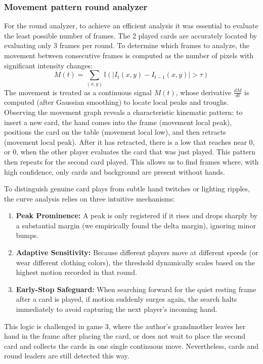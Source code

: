 \documentclass[11pt,a4paper]{article}
\begin{document}
\subsubsection{Movement pattern round analyzer}
For the round analyzer, to achieve an efficient analysis it was essential to
evaluate the least possible number of frames. The 2 played cards are accurately
located by evaluating only 3 frames per round. To determine which frames to
analyze, the movement between consecutive frames is computed as the number of
pixels with significant intensity changes:
\begin{equation}
    M(t) = \sum_{(x,y)} \mathbb{I}\left( \left| I_t(x,y) - I_{t-1}(x,y) \right| > \tau \right)
\end{equation}
The movement is treated as a continuous signal $M(t)$, whose derivative
$\frac{dM}{dt}$ is computed (after Gaussian smoothing) to locate local peaks and
troughs. Observing the movement graph reveals a characteristic kinematic pattern:
to insert a new card, the hand comes into the frame (movement local peak),
positions the card on the table (movement local low), and then retracts (movement
local peak). After it has retracted, there is a low that reaches near 0, or 0,
when the other player evaluates the card that was just played. This pattern then
repeats for the second card played. This allows us to find frames where, with
high confidence, only cards and background are present without hands.

To distinguish genuine card plays from subtle hand twitches or lighting ripples, the curve analysis relies on three intuitive mechanisms:
\begin{enumerate}
    \item \textbf{Peak Prominence:} A peak is only registered if it rises and drops sharply by a substantial margin (we empirically found the delta margin), ignoring minor bumps.
    \item \textbf{Adaptive Sensitivity:} Because different players move at different speeds (or wear different clothing colors), the threshold dynamically scales based on the highest motion recorded in that round.
    \item \textbf{Early-Stop Safeguard:} When searching forward for the quiet resting frame after a card is played, if motion suddenly surges again, the search halts immediately to avoid capturing the next player's incoming hand.
\end{enumerate}

This logic is challenged in game 3, where the author's grandmother leaves her
hand in the frame after placing the card, or does not wait to place the second
card and collects the cards in one single continuous move. Nevertheless, cards
and round leaders are still detected this way.
\end{document}
